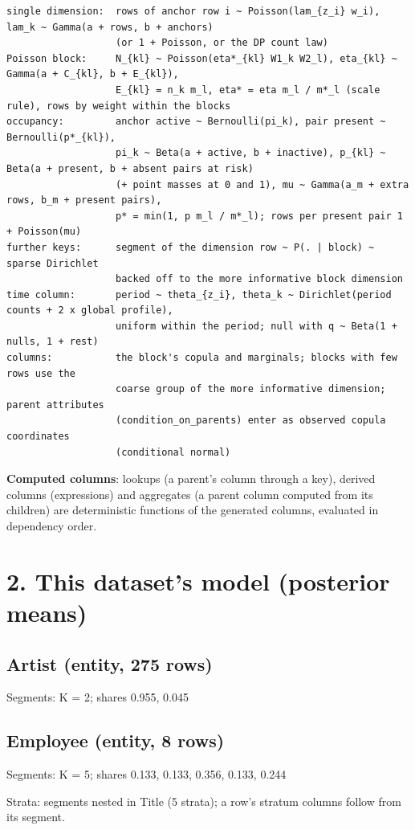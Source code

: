 \documentclass[10pt]{article}
\begin{document}
\begin{verbatim}
single dimension:  rows of anchor row i ~ Poisson(lam_{z_i} w_i), lam_k ~ Gamma(a + rows, b + anchors)
                   (or 1 + Poisson, or the DP count law)
Poisson block:     N_{kl} ~ Poisson(eta*_{kl} W1_k W2_l), eta_{kl} ~ Gamma(a + C_{kl}, b + E_{kl}),
                   E_{kl} = n_k m_l, eta* = eta m_l / m*_l (scale rule), rows by weight within the blocks
occupancy:         anchor active ~ Bernoulli(pi_k), pair present ~ Bernoulli(p*_{kl}),
                   pi_k ~ Beta(a + active, b + inactive), p_{kl} ~ Beta(a + present, b + absent pairs at risk)
                   (+ point masses at 0 and 1), mu ~ Gamma(a_m + extra rows, b_m + present pairs),
                   p* = min(1, p m_l / m*_l); rows per present pair 1 + Poisson(mu)
further keys:      segment of the dimension row ~ P(. | block) ~ sparse Dirichlet
                   backed off to the more informative block dimension
time column:       period ~ theta_{z_i}, theta_k ~ Dirichlet(period counts + 2 x global profile),
                   uniform within the period; null with q ~ Beta(1 + nulls, 1 + rest)
columns:           the block's copula and marginals; blocks with few rows use the
                   coarse group of the more informative dimension; parent attributes
                   (condition_on_parents) enter as observed copula coordinates
                   (conditional normal)
\end{verbatim}
\textbf{Computed columns}: lookups (a parent's column through a key), derived columns
(expressions) and aggregates (a parent column computed from its children) are
deterministic functions of the generated columns, evaluated in dependency order.

\section*{2. This dataset's model (posterior means)}

\subsection*{Artist (entity, 275 rows)}
Segments: K = 2; shares 0.955, 0.045


\subsection*{Employee (entity, 8 rows)}
Segments: K = 5; shares 0.133, 0.133, 0.356, 0.133, 0.244

Strata: segments nested in Title (5 strata); a row's stratum columns follow from its segment.
\end{document}
